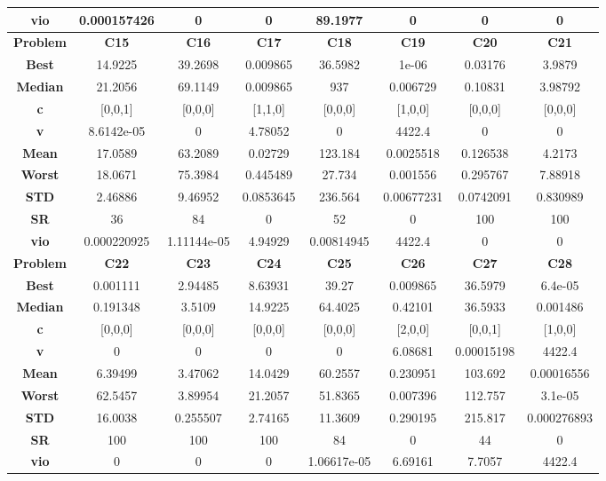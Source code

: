 \documentclass{IEEEtran}
\begin{document}
\begin{center}
\begin{tabular}{|c|c|c|c|c|c|c|c|}
    \textbf{vio} & 0.000157426 & 0 & 0 & 89.1977 & 0 & 0 & 0\\ 
    \hline 
    \hline 
    \textbf{Problem} & \textbf{C15} & \textbf{C16} & \textbf{C17} & \textbf{C18} & \textbf{C19} & \textbf{C20} & \textbf{C21} \\ 
    \hline\hline 
    \textbf{Best} & 14.9225 & 39.2698 & 0.009865 & 36.5982 & 1e-06 & 0.03176 & 3.9879\\ 
    \textbf{Median} & 21.2056 & 69.1149 & 0.009865 & 937 & 0.006729 & 0.10831 & 3.98792\\ 
    \textbf{c} & [0,0,1] & [0,0,0] & [1,1,0] & [0,0,0] & [1,0,0] & [0,0,0] & [0,0,0]\\ 
    \textbf{v} & 8.6142e-05 & 0 & 4.78052 & 0 & 4422.4 & 0 & 0\\ 
    \textbf{Mean} & 17.0589 & 63.2089 & 0.02729 & 123.184 & 0.0025518 & 0.126538 & 4.2173\\ 
    \textbf{Worst} & 18.0671 & 75.3984 & 0.445489 & 27.734 & 0.001556 & 0.295767 & 7.88918\\ 
    \textbf{STD} & 2.46886 & 9.46952 & 0.0853645 & 236.564 & 0.00677231 & 0.0742091 & 0.830989\\ 
    \textbf{SR} & 36 & 84 & 0 & 52 & 0 & 100 & 100\\ 
    \textbf{vio} & 0.000220925 & 1.11144e-05 & 4.94929 & 0.00814945 & 4422.4 & 0 & 0\\ 
    \hline 
    \hline 
    \textbf{Problem} & \textbf{C22} & \textbf{C23} & \textbf{C24} & \textbf{C25} & \textbf{C26} & \textbf{C27} & \textbf{C28} \\ 
    \hline\hline 
    \textbf{Best} & 0.001111 & 2.94485 & 8.63931 & 39.27 & 0.009865 & 36.5979 & 6.4e-05\\ 
    \textbf{Median} & 0.191348 & 3.5109 & 14.9225 & 64.4025 & 0.42101 & 36.5933 & 0.001486\\ 
    \textbf{c} & [0,0,0] & [0,0,0] & [0,0,0] & [0,0,0] & [2,0,0] & [0,0,1] & [1,0,0]\\ 
    \textbf{v} & 0 & 0 & 0 & 0 & 6.08681 & 0.00015198 & 4422.4\\ 
    \textbf{Mean} & 6.39499 & 3.47062 & 14.0429 & 60.2557 & 0.230951 & 103.692 & 0.00016556\\ 
    \textbf{Worst} & 62.5457 & 3.89954 & 21.2057 & 51.8365 & 0.007396 & 112.757 & 3.1e-05\\ 
    \textbf{STD} & 16.0038 & 0.255507 & 2.74165 & 11.3609 & 0.290195 & 215.817 & 0.000276893\\ 
    \textbf{SR} & 100 & 100 & 100 & 84 & 0 & 44 & 0\\ 
    \textbf{vio} & 0 & 0 & 0 & 1.06617e-05 & 6.69161 & 7.7057 & 4422.4\\ 
    \hline 
  \end{tabular}
\end{center}
\newpage
\end{document}
